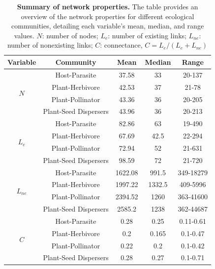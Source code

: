 \documentclass[oneside, a4paper, onecolumn, 11pt]{article}
\begin{document}
\begin{refsection}
\clearpage

\begin{table}[ht]
    \centering
    \caption{\textbf{Summary of network properties.} The table provides an overview of the network properties for different ecological communities, detailing each variable's mean, median, and range values. $N$: number of nodes; $L_e$: number of existing links; $L_{ne}$: number of nonexisting links; $C$: connectance, $C=L_e/(L_e+L_{ne})$}
    \label{tab:SI_networks_summary_properties}
    \begin{tabular}{ccccc}
        \toprule
        Variable & Community & Mean & Median & Range \\
        \midrule
        \multirow{4}{*}{$N$} & Host-Parasite & 37.58 & 33 & 20-137 \\
                             & Plant-Herbivore & 42.53 & 37 & 21-78 \\
                             & Plant-Pollinator & 43.36 & 36 & 20-205 \\
                             & Plant-Seed Dispersers & 43.96 & 36 & 20-213 \\
        \multirow{4}{*}{$L_e$} & Host-Parasite & 82.86 & 63 & 19-490 \\
                                & Plant-Herbivore & 67.69 & 42.5 & 22-294 \\
                                & Plant-Pollinator & 72.94 & 52 & 21-631 \\
                                & Plant-Seed Dispersers & 98.59 & 72 & 21-720 \\
        \multirow{4}{*}{$L_{ne}$} & Host-Parasite & 1622.08 & 991.5 & 349-18279 \\
                                  & Plant-Herbivore & 1997.22 & 1332.5 & 409-5996 \\
                                  & Plant-Pollinator & 2394.52 & 1260 & 363-41600 \\
                                  & Plant-Seed Dispersers & 2585.2 & 1238 & 362-44687 \\
        \multirow{4}{*}{$C$} & Host-Parasite & 0.28 & 0.25 & 0.11-0.61 \\
                             & Plant-Herbivore & 0.2 & 0.165 & 0.1-0.47 \\
                             & Plant-Pollinator & 0.22 & 0.2 & 0.1-0.42 \\
                             & Plant-Seed Dispersers & 0.28 & 0.27 & 0.1-0.71 \\
        \bottomrule
    \end{tabular}
\end{table}



\end{refsection}
\end{document}
